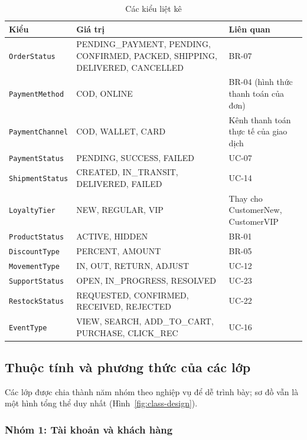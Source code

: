 \documentclass[12pt,a4paper,oneside]{report}
\begin{document}
\begin{longtable}{p{3.4cm}p{7.4cm}p{5cm}}
\caption{Các kiểu liệt kê}\\
\toprule
\textbf{Kiểu} & \textbf{Giá trị} & \textbf{Liên quan} \\
\midrule
\endhead
\bottomrule
\endlastfoot
\texttt{OrderStatus} & PENDING\_PAYMENT, PENDING, CONFIRMED, PACKED, SHIPPING, DELIVERED, CANCELLED & BR-07 \\
\texttt{PaymentMethod} & COD, ONLINE & BR-04 (hình thức thanh toán của đơn) \\
\texttt{PaymentChannel} & COD, WALLET, CARD & Kênh thanh toán thực tế của giao dịch \\
\texttt{PaymentStatus} & PENDING, SUCCESS, FAILED & UC-07 \\
\texttt{ShipmentStatus} & CREATED, IN\_TRANSIT, DELIVERED, FAILED & UC-14 \\
\texttt{LoyaltyTier} & NEW, REGULAR, VIP & Thay cho CustomerNew, CustomerVIP \\
\texttt{ProductStatus} & ACTIVE, HIDDEN & BR-01 \\
\texttt{DiscountType} & PERCENT, AMOUNT & BR-05 \\
\texttt{MovementType} & IN, OUT, RETURN, ADJUST & UC-12 \\
\texttt{SupportStatus} & OPEN, IN\_PROGRESS, RESOLVED & UC-23 \\
\texttt{RestockStatus} & REQUESTED, CONFIRMED, RECEIVED, REJECTED & UC-22 \\
\texttt{EventType} & VIEW, SEARCH, ADD\_TO\_CART, PURCHASE, CLICK\_REC & UC-16 \\
\end{longtable}

\subsection{Thuộc tính và phương thức của các lớp}

Các lớp được chia thành năm nhóm theo nghiệp vụ để dễ trình bày; sơ đồ vẫn là một hình tổng thể duy nhất (Hình~\ref{fig:class-design}).

\subsubsection*{Nhóm 1: Tài khoản và khách hàng}
\end{document}
